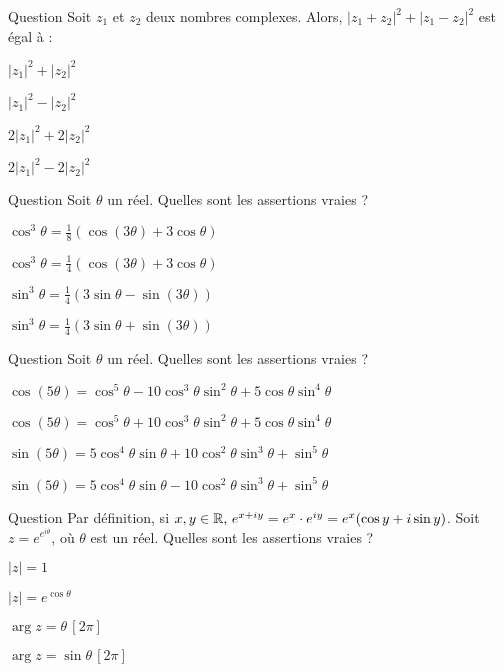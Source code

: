 \begin{multi}[multiple,feedback=
{Utiliser :  \(|z|^2= z\overline{z}\).
}]{Question}
Soit \(z_1\) et \(z_2\) deux nombres complexes. Alors, \(|z_1+z_2|^2 + |z_1-z_2|^2\) est égal à :

    \item \(|z_1|^2+|z_2|^2\)
    \item \(|z_1|^2-|z_2|^2\)
    \item* \( 2|z_1|^2 +2|z_2|^2\)
    \item \( 2|z_1|^2 -2|z_2|^2\)
\end{multi}


\begin{multi}[multiple,feedback=
{On peut appliquer les formules d'Euler.
}]{Question}
Soit \(\theta\) un réel.  Quelles sont les assertions vraies ?

    \item \(\cos^3\theta= \frac{1}{8}(\cos(3\theta) +3\cos \theta)\)
    \item* \(\cos^3\theta= \frac{1}{4}(\cos(3\theta) + 3\cos \theta)\)
    \item* \(\sin^3\theta= \frac{1}{4}(3\sin \theta - \sin(3\theta))\)
    \item \(\sin^3\theta= \frac{1}{4}(3\sin \theta + \sin(3\theta))\)
\end{multi}


\begin{multi}[multiple,feedback=
{On peut appliquer la formule de Moivre.
}]{Question}
Soit \(\theta\) un réel.  Quelles sont les assertions vraies ?

    \item* \(\cos(5\theta)= \cos^5\theta -10\cos^3\theta \sin^2\theta + 5\cos \theta\sin^4 \theta\)
    \item \(\cos(5\theta)= \cos^5\theta +10\cos^3\theta \sin^2\theta + 5\cos \theta\sin^4 \theta\)
    \item \(\sin(5\theta)= 5\cos^4\theta \sin\theta+10\cos^2\theta \sin^3\theta + \sin^5\theta\)
    \item* \(\sin(5\theta)= 5\cos^4\theta \sin\theta-10\cos^2\theta \sin^3\theta + \sin^5\theta\)
\end{multi}


\begin{multi}[multiple,feedback=
{\(z= e^{\cos  \theta + i \sin \theta}= e^{\cos\theta}\cdot e^{i \sin \theta}.  \) Donc \(|z|=e^{\cos \theta} \) et \(\arg z = \sin \theta \, [2\pi]\).
}]{Question}
Par définition, si  \(x,y \in \mathbb{R}, \, e^{x+iy} = e^x \cdot e^{iy}= e^x (\cos y +i \sin y)\).
Soit \(z=e^{e^{i\theta}}\), où \(\theta\) est un réel. Quelles sont les assertions vraies ?

    \item \(|z|=1 \)
    \item* \(|z|=e^{\cos \theta} \)
    \item \(\arg z = \theta \,  [2\pi]\)
    \item* \(\arg z = \sin \theta \, [2\pi]\)
\end{multi}


